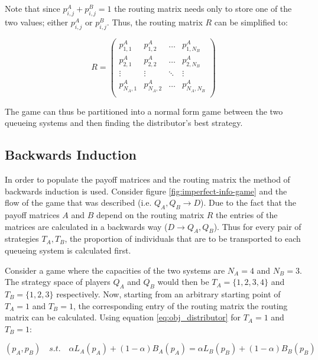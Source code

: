 Note that since \(p_{i,j}^A + p_{i,j}^B = 1\) the routing matrix needs only to
store one of the two values; either \(p_{i,j}^A\) or \(p_{i,j}^B\).
Thus, the routing matrix \(R\) can be simplified to:

\begin{equation}\label{eq:routing_matrix_simplified}
    R = 
    \begin{pmatrix}
        p_{1,1}^A & p_{1,2}^A & \dots & p_{1,N_B}^A \\
        p_{2,1}^A & p_{2,2}^A & \dots & p_{2,N_B}^A \\
        \vdots & \vdots & \ddots & \vdots \\
        p_{N_A,1}^A & p_{N_A,2}^A & \dots & p_{N_A,N_B}^A \\
    \end{pmatrix}
\end{equation}

The game can thus be partitioned into a normal form game between the
two queueing systems and then finding the distributor's best strategy. 

\subsection{Backwards Induction}

In order to populate the payoff matrices and the routing matrix the method
of backwards induction is used.
Consider figure \ref{fig:imperfect-info-game} and the flow of the game that was
described (i.e. \(Q_A, Q_B \rightarrow D\)).
Due to the fact that the payoff matrices \(A\) and \(B\) depend on the routing 
matrix \(R\) the entries of the matrices are calculated in a backwards way 
(\(D \rightarrow Q_A, Q_B\)). 
Thus for every pair of strategies \(T_A, T_B\), the proportion of individuals 
that are to be transported to each queueing system is calculated first. 

Consider a game where the capacities of the two systems are \(N_A = 4\) and 
\(N_B = 3\).
The strategy space of players \(Q_A\) and \(Q_B\) would then be 
\(T_A = \{1, 2, 3, 4\}\) and \(T_B = \{1, 2, 3\}\) respectively.
Now, starting from an arbitrary starting point of \(T_A=1\) and \(T_B=1\), the
corresponding entry of the routing matrix the routing matrix can be calculated.
Using equation \ref{eq:obj_distributor} for \(T_A=1\) and \(T_B=1\):

\begin{equation*}
    (p_A, p_B) \quad s.t. \quad 
    \alpha L_A(p_A) + (1 - \alpha) B_A(p_A) = 
    \alpha L_B(p_B) + (1 - \alpha) B_B(p_B)
\end{equation*}

